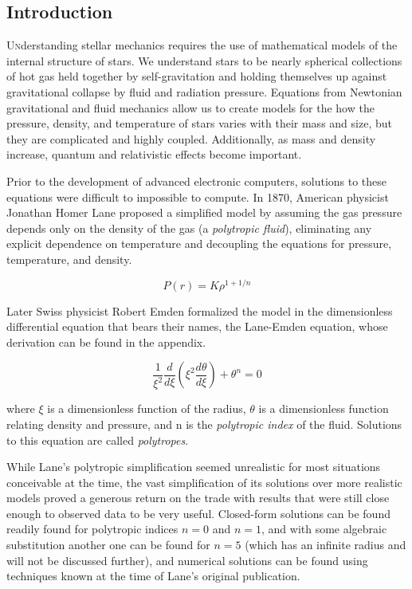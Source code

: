 \documentclass[twoside]{article}
\begin{document}
\begin{multicols}{2} %

\section{Introduction}

\lettrine[nindent=0em,lines=2]{U}nderstanding stellar mechanics requires the use
of mathematical models of the internal structure of stars. We understand stars
to be nearly spherical collections of hot gas held together by self-gravitation
and holding themselves up against gravitational collapse by fluid and radiation
pressure. Equations from Newtonian gravitational and fluid mechanics allow us to
create models for the how the pressure, density, and temperature of stars varies
with their mass and size, but they are complicated and highly
coupled.\cite{hansen2004} Additionally, as mass and density increase, quantum
and relativistic effects become important.

Prior to the development of advanced electronic computers, solutions to these
equations were difficult to impossible to compute. In 1870, American physicist
Jonathan Homer Lane proposed a simplified model\cite{lane1870} by assuming the
gas pressure depends only on the density of the gas (a \emph{polytropic fluid}),
eliminating any explicit dependence on temperature and decoupling the equations
for pressure, temperature, and density.

    \begin{equation}
        \label{eq:polystate}
        P(r) = K\rho^{1+1/n}
    \end{equation}
    
Later Swiss physicist Robert Emden formalized the model in the dimensionless
differential equation that bears their names, the Lane-Emden equation, whose
derivation can be found in the appendix.

    \begin{equation}
        \label{eq:le}
        \frac{1}{\xi^2}\frac{d}{d\xi}\left(\xi^2\frac{d\theta}{d\xi}\right)+\theta^n=0
    \end{equation}

where \(\xi\) is a dimensionless function of the radius, \(\theta\) is a
dimensionless function relating density and pressure, and n is the
\emph{polytropic index} of the fluid.  Solutions to this equation are called
\emph{polytropes}.

While Lane's polytropic simplification seemed unrealistic for most situations
conceivable at the time, the vast simplification of its solutions over more
realistic models proved a generous return on the trade with results that were
still close enough to observed data to be very useful. Closed-form
solutions\cite{leblanc2010} can
be found readily found for polytropic indices \(n=0\) and \(n=1\), and with some
algebraic substitution another one can be found for \(n=5\) (which has an
infinite radius and will not be discussed further), and numerical solutions can
be found using techniques known at the time of Lane's original publication.


\end{multicols}
\end{document}
